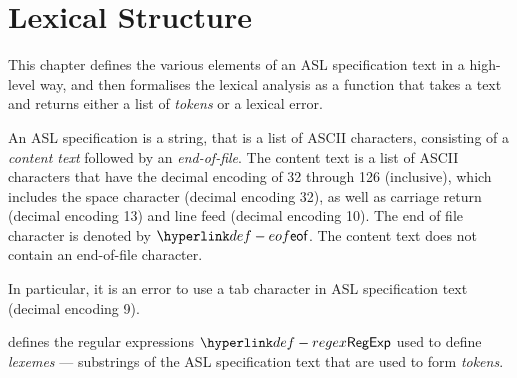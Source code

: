 \chapter{Lexical Structure\label{chap:LexicalStructure}}
This chapter defines the various elements of an ASL specification text in a high-level way,
and then formalises the lexical analysis as a function that takes a text and returns
either a list of \emph{tokens} or a lexical error.

\ChapterOutline

An ASL specification is a string, that is a list of ASCII characters, consisting of a \emph{content text}
followed by an \emph{end-of-file}.
The content text is a list of
ASCII characters that have the decimal encoding of 32 through 126 (inclusive),
which includes the space character (decimal encoding 32),
as well as
carriage return (decimal encoding 13) and line feed (decimal encoding 10).
\hypertarget{def-eof}{}
The end of file character is denoted by $\eof$.
The content text does not contain an end-of-file character.

In particular, it is an error to use a tab character in ASL specification text (decimal encoding 9).

\hypertarget{def-regex}{}
 defines the regular expressions $\RegExp$ used to define
\emph{lexemes} --- substrings of the ASL specification text that are used to form \emph{tokens}.

